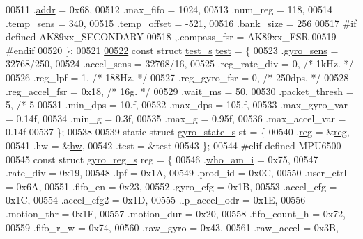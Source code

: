 \begin{DoxyCode}
00511     .\hyperlink{structhw__s_a4c34a946600e9d68b6355d23f54d291b}{addr}           = 0x68,
00512     .max\_fifo       = 1024,
00513     .num\_reg        = 118,
00514     .temp\_sens      = 340,
00515     .temp\_offset    = -521,
00516     .bank\_size      = 256
00517 \textcolor{preprocessor}{#if defined AK89xx\_SECONDARY}
00518     ,.compass\_fsr    = AK89xx\_FSR
00519 \textcolor{preprocessor}{#endif}
00520 \};
00521 
\hypertarget{inv__mpu_8c_source.tex_l00522}{}\hyperlink{inv__mpu_8c_a1e8f8b1ef7fb2c429e1ce7c2f9985530}{00522} \textcolor{keyword}{const} \textcolor{keyword}{struct }\hyperlink{structtest__s}{test\_s} \hyperlink{inv__mpu_8c_a1e8f8b1ef7fb2c429e1ce7c2f9985530}{test} = \{
00523     .\hyperlink{structtest__s_a32da1174cf6569aa99bdff70055bb45a}{gyro\_sens}      = 32768/250,
00524     .accel\_sens     = 32768/16,
00525     .reg\_rate\_div   = 0,    \textcolor{comment}{/* 1kHz. */}
00526     .reg\_lpf        = 1,    \textcolor{comment}{/* 188Hz. */}
00527     .reg\_gyro\_fsr   = 0,    \textcolor{comment}{/* 250dps. */}
00528     .reg\_accel\_fsr  = 0x18, \textcolor{comment}{/* 16g. */}
00529     .wait\_ms        = 50,
00530     .packet\_thresh  = 5,    \textcolor{comment}{/* 5%
00531     .min\_dps        = 10.f,
00532     .max\_dps        = 105.f,
00533     .max\_gyro\_var   = 0.14f,
00534     .min\_g          = 0.3f,
00535     .max\_g          = 0.95f,
00536     .max\_accel\_var  = 0.14f
00537 \};
00538 
00539 \textcolor{keyword}{static} \textcolor{keyword}{struct }\hyperlink{structgyro__state__s}{gyro\_state\_s} st = \{
00540     .\hyperlink{structgyro__state__s_ae857e1285c583b7438a208edd691a38e}{reg} = &\hyperlink{inv__mpu_8c_a5448c351fc95ff052b110eee80e5f75c}{reg},
00541     .hw = &\hyperlink{inv__mpu_8c_a7fefd0bb47e09b7e39e25e9795cd7edc}{hw},
00542     .test = &test
00543 \};
00544 \textcolor{preprocessor}{#elif defined MPU6500}
00545 \textcolor{keyword}{const} \textcolor{keyword}{struct }\hyperlink{structgyro__reg__s}{gyro\_reg\_s} reg = \{
00546     .\hyperlink{structgyro__reg__s_aa52d78bb2b62fee23a0b759e545dba4b}{who\_am\_i}       = 0x75,
00547     .rate\_div       = 0x19,
00548     .lpf            = 0x1A,
00549     .prod\_id        = 0x0C,
00550     .user\_ctrl      = 0x6A,
00551     .fifo\_en        = 0x23,
00552     .gyro\_cfg       = 0x1B,
00553     .accel\_cfg      = 0x1C,
00554     .accel\_cfg2     = 0x1D,
00555     .lp\_accel\_odr   = 0x1E,
00556     .motion\_thr     = 0x1F,
00557     .motion\_dur     = 0x20,
00558     .fifo\_count\_h   = 0x72,
00559     .fifo\_r\_w       = 0x74,
00560     .raw\_gyro       = 0x43,
00561     .raw\_accel      = 0x3B,
}
\end{DoxyCode}
